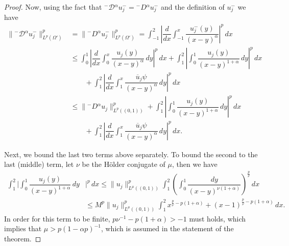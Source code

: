 \documentclass[leqno,final]{siamltex}
\numberwithin{equation}{section}
\renewcommand{\(}{\bigl(}
\renewcommand{\)}{\bigr)}
\begin{document}
\begin{proof}
         Now, using the fact that ${^{-}}{\mathcal{D}}{^{\alpha}} u_j^- = {^{-}}{D}{^{\alpha}} u_j^-$
         and the definition of $u_j^-$ we have 
        \begin{align*}
            \|{^{-}}{\mathcal{D}}{^{\alpha}} u_j^-\|_{L^{p}(\Omega')}^{p} &=
            \|{^{-}}{D}{^{\alpha}} u_j^-\|_{L^{p}(\Omega')}^{p} 
            = \int_{-1}^{2}\left|\dfrac{d}{dx} \int_{-1}^{x} \dfrac{u_j^-(y)}{(x-y)^{\alpha}}\right|^{p}\,dx \\ 
            &\leq \int_{0}^{1}\left|\dfrac{d}{dx} \int_{0}^{x} \dfrac{u_j(y)}{(x-y)^{\alpha}}\,dy \right|^{p}\,dx 
            + \int_{1}^{2} \left|\int_{0}^{1} \dfrac{u_j(y)}{(x-y)^{1+\alpha}}\,dy \right|^{p}\,dx \\
            &\qquad +  \int_{1}^{2}\left|\dfrac{d}{dx} \int_{1}^{x} \dfrac{\overline{u}_j\psi}{(x-y)^{\alpha}}\,dy \right|^{p}\,dx \\
            &\leq \|{^{-}}{D}{^{\alpha}} u_j \|_{L^{p}((0,1))}^{p} + \int_{1}^{2} \left|\int_{0}^{1} \dfrac{u_j(y)}{(x-y)^{1+\alpha}}\,dy \right|^{p}\,dx  \\
            &\qquad + \int_{1}^{2}\left|\dfrac{d}{dx} \int_{1}^{x} \dfrac{\overline{u}_j\psi}{(x-y)^{\alpha}}\,dy \right|^{p}\,dx.
        \end{align*}
        
        Next, we bound  the last two terms above separately.
        To bound the second to the last (middle) term,  let  $\nu$ be the H\"older conjugate of $\mu$, then we have 
        \begin{align*}
            \int_{1}^{2} \biggl|\int_{0}^{1} \dfrac{u_j(y)}{(x-y)^{1+\alpha}}\,dy &\biggr|^{p}\,dx \leq \|u_j\|_{L^{\mu}((0,1))}^{p} \int_{1}^{2}\left(\int_{0}^{1}\dfrac{dy}{(x-y)^{\nu(1+\alpha)}}\right)^{\frac{p}{\nu}}\,dx\\
            &\leq M^{p}\| u_j \|_{L^{\mu}((0,1))}^{p} \int_{1}^{2} x^{\frac{p}{\nu} - p(1+\alpha)} + (x-1)^{\frac{p}{\nu} -p(1+\alpha)}\,dx.
        \end{align*}
        In order for this term to be finite, $p\nu^{-1}- p(1+\alpha)>-1 $ must holds,  which 
        implies that $\mu > p(1 - \alpha p)^{-1}$, which is assumed in the statement of the theorem. 
        

\end{proof}
\end{document}
